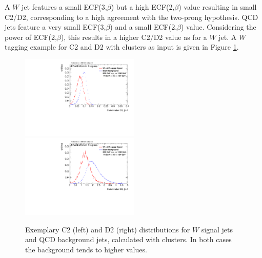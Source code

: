 A $W$ jet features a small ECF(3,$\beta$) but a high ECF(2,$\beta$) value resulting in small C2/D2, corresponding to a high agreement with the two-prong hypothesis. QCD jets feature a very small ECF(3,$\beta$) and a small ECF(2,$\beta$) value. Considering the power of ECF(2,$\beta$), this results in a higher C2/D2 value as for a $W$ jet. A $W$ tagging example for C2 and D2 with clusters as input is given in Figure \ref{fig:ECF_example}.
\begin{figure}
\includegraphics[width=0.5\textwidth]{sascha_input/plots/W/Beta1/h_recoJet_C2_bin3.pdf} \hspace{1mm}
\includegraphics[width=0.5\textwidth]{sascha_input/plots/W/Beta1/h_recoJet_D2_bin3.pdf} 
\caption{Exemplary C2 (left) and D2 (right) distributions for $W$ signal jets and QCD background jets, calculated with clusters. In both cases the background tends to higher values.}\label{fig:ECF_example}
\end{figure}